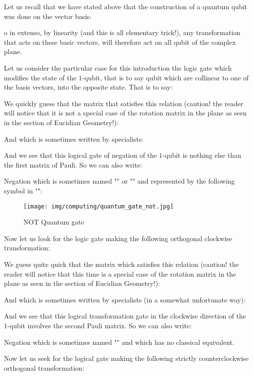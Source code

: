 	Let us recall that we have stated above that the construction of a quantum qubit was done on the vector basis:
	
	o in extenso, by linearity (and this is all elementary trick!), any transformation that acts on these basic vectors, will therefore act on all qubit of the complex plane.

	Let us consider the particular case for this introduction the logic gate which modifies the state of the $1$-qubit, that is to say qubit which are collinear to one of the basis vectors, into the opposite state. That is to say:
	
	We quickly guess that the matrix that satisfies this relation (caution! the reader will notice that it is not a special case of the rotation matrix in the plane as seen in the section of Eucidian Geometry!):
	
	And which is sometimes written by specialists:
	
	And we see that this logical gate of negation of the $1$-qubit is nothing else than the first matrix of Pauli. So we can also write:
	
	Negation which is sometimes named "" or "" and represented by the following symbol in "":
	\begin{figure}[H]
		\centering
		\texttt{[image: img/computing/quantum\_gate\_not.jpg]}	
		\caption{NOT Quantum gate}
	\end{figure}
	Now let us look for the logic gate making the following orthogonal clockwise transformation:
	
	We guess quite quick that the matrix which satisfies this relation (caution! the reader will notice that this time is a special case of the rotation matrix in the plane as seen in the section of Eucidian Geometry!):
	
	And which is sometimes written by specialists (in a somewhat unfortunate way):
	
	
	And we see that this logical transformation gate in the clockwise direction of the $1$-qubit involves the second Pauli matrix. So we can also write:
	
	Negation which is sometimes named "" and which has no classical equivalent.
	
	Now let us seek for the logical gate making the following strictly counterclockwise orthogonal transformation:
	
